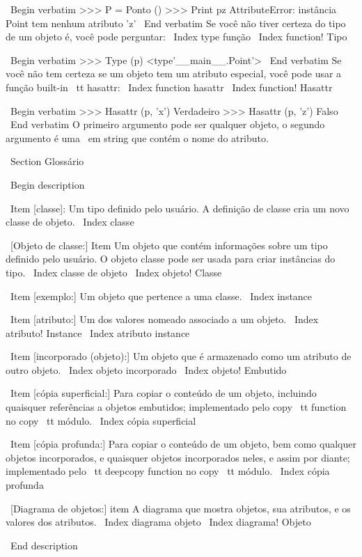 \documentclass[10pt]{book}
\begin{document}
\begin {itemize}
{{{{{{{{{{{{{\ Begin {verbatim}
>>> P = Ponto ()
>>> Print pz
AttributeError: instância Point tem nenhum atributo 'z'
\ End {verbatim}
%
Se você não tiver certeza do tipo de um objeto é, você pode perguntar:
\ Index {type função}
\ Index {function! Tipo}

\ Begin {verbatim}
>>> Type (p)
<type'__main__.Point'>
\ End {verbatim}
%
Se você não tem certeza se um objeto tem um atributo especial,
você pode usar a função built-in {\ tt hasattr}:
\ Index {function hasattr}
\ Index {function! Hasattr}

\ Begin {verbatim}
>>> Hasattr (p, 'x')
Verdadeiro
>>> Hasattr (p, 'z')
Falso
\ End {verbatim}
%
O primeiro argumento pode ser qualquer objeto, o segundo argumento é uma {\ em
string} que contém o nome do atributo.


\ Section {} Glossário

\ Begin {description}

\ Item [classe]: Um tipo definido pelo usuário. A definição de classe cria um novo
classe de objeto.
\ Index {classe}

\ [Objeto de classe:] Item Um objeto que contém informações sobre um
tipo definido pelo usuário. O objeto classe pode ser usada para criar instâncias
do tipo.
\ Index {classe de objeto}
\ Index {objeto! Classe}

\ Item [exemplo:] Um objeto que pertence a uma classe.
\ Index {instance}

\ Item [atributo:] Um dos valores nomeado associado a um objeto.
\ Index {atributo! Instance}
\ Index {atributo instance}

\ Item [incorporado (objeto):] Um objeto que é armazenado como um atributo
de outro objeto.
\ Index {objeto incorporado}
\ Index {objeto! Embutido}

\ Item [cópia superficial:] Para copiar o conteúdo de um objeto, incluindo
quaisquer referências a objetos embutidos;
implementado pelo {copy \ tt} function no {copy \ tt} módulo.
\ Index {cópia superficial}

\ Item [cópia profunda:] Para copiar o conteúdo de um objeto, bem como qualquer
objetos incorporados, e quaisquer objetos incorporados neles, e assim por diante;
implementado pelo {\ tt deepcopy} function no {copy \ tt} módulo.
\ Index {cópia profunda}

\ [Diagrama de objetos:] item A diagrama que mostra objetos, sua
atributos, e os valores dos atributos.
\ Index {diagrama objeto}
\ Index {diagrama! Objeto}

\ End {description}


}}}}}}}}}}}}}
\end{itemize}
\end{document}
